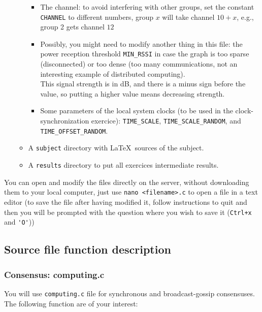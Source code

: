 \documentclass{article}
\begin{document}
\begin{itemize}
\begin{itemize}
\begin{itemize}
		\item The channel: to avoid interfering with other groups, set the
            constant \verb=CHANNEL= to different numbers, group $x$ will take
            channel $10+x$, e.g., group 2 gets channel $12$
		\item Possibly, you might  need to modify another thing in this file:
            the power reception threshold \verb=MIN_RSSI= in case the graph is
            too sparse (disconnected) or too dense (too many communications, not
            an interesting example of distributed computing).\\
            This signal strength is in dB, and there is a minus sign before the value,
            so putting a higher value means decreasing strength.
         \item Some parameters of the local system clocks (to be used in the clock-synchronization exercice): \verb=TIME_SCALE=, \verb=TIME_SCALE_RANDOM=, and \verb=TIME_OFFSET_RANDOM=.
		\end{itemize}
    \item A \verb=subject= directory with \LaTeX~sources of the subject.
    \item A \verb=results= directory to put all exercices intermediate results.
	\end{itemize}
\end{itemize}

You can open and modify the files directly on the server, without downloading
them to your local computer, just use \verb=nano <filename>.c= to open a file in
a text editor (to save the file after having modified it, follow instructions to
quit and then you will be prompted with the question where you wish to save it
(\verb=Ctrl+x= and \verb='O'=))


\subsection{Source file function description}


\subsubsection{Consensus: computing.c}

You will use \verb=computing.c= file for synchronous and broadcast-gossip consensuses.
The following function are of your interest:
\end{document}
